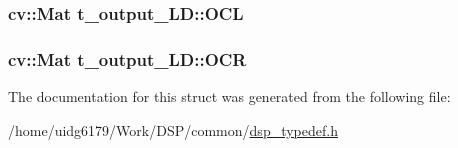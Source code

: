 \subsubsection[{\texorpdfstring{O\+CL}{OCL}}]{\setlength{\rightskip}{0pt plus 5cm}cv\+::\+Mat t\+\_\+output\+\_\+\+L\+D\+::\+O\+CL}\hypertarget{structt__output__LD_a5df4d82612808126e652c4aeb217d2df}{}\label{structt__output__LD_a5df4d82612808126e652c4aeb217d2df}
\subsubsection[{\texorpdfstring{O\+CR}{OCR}}]{\setlength{\rightskip}{0pt plus 5cm}cv\+::\+Mat t\+\_\+output\+\_\+\+L\+D\+::\+O\+CR}\hypertarget{structt__output__LD_a42f844f6c822a86f44f57e4ae0a58bb2}{}\label{structt__output__LD_a42f844f6c822a86f44f57e4ae0a58bb2}


The documentation for this struct was generated from the following file\+:\begin{DoxyCompactItemize}
\item 
/home/uidg6179/\+Work/\+D\+S\+P/common/\hyperlink{dsp__typedef_8h}{dsp\+\_\+typedef.\+h}\end{DoxyCompactItemize}
